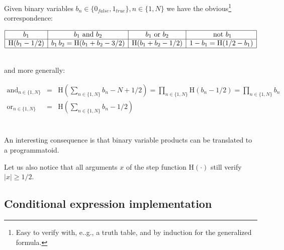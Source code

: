 \documentclass[a4]{article} \usepackage[left=2cm,right=3cm,top=1cm,bottom=2cm]{geometry}
\newcommand{\eqline}[1]{~\vspace{0.1cm}\\\centerline{$#1$}\vspace{0.1cm}\\}
\begin{document}
Given binary variables $b_n \in \{0_{{false}}, 1_{{true}}\}, n \in \{1, N\}$ we have the obvious\footnote{Easy to verify with, e..g., a truth table, and by induction for the generalized formula.} correspondence:
\eqline{\begin{array}{|c|c|c|c|} \hline
    b_1               & b_1 \mbox{ and } b_2                &  b_1 \mbox{ or } b_2   & \mbox{ not } b_1 \\ \hline
    \mbox{H}(b_1 - 1/2) & b_1 \, b_2 = \mbox{H}(b_1 + b_ 2 - 3/2)  & \mbox{H}(b_1 + b_ 2 - 1/2)       & 1 - b_1  = \mbox{H}(1/2 - b_1) \\ \hline
\end{array}} and more generally:
\eqline{\begin{array}{rcl}
    \mbox{and}_{n \in \{1, N\}} &=& \mbox{H}\left(\sum_{n \in \{1, N\}} b_n - N + 1/2\right) = \prod_{n \in \{1,  N\}} \mbox{H}(b_n - 1/2) = \prod_{n \in \{1,  N\}} b_n \\
    \mbox{or}_{n \in \{1, N\}} &=& \mbox{H}\left(\sum_{n \in \{1, N\}} b_n - 1/2\right) \\
\end{array}}

An interesting consequence is that binary variable products can be translated to a programmatoid.

Let us also notice that all arguments $x$ of the step function $\mbox{H}(\cdot)$ still verify $|x| \ge 1/2$.

\subsection{Conditional expression implementation}
\end{document}
